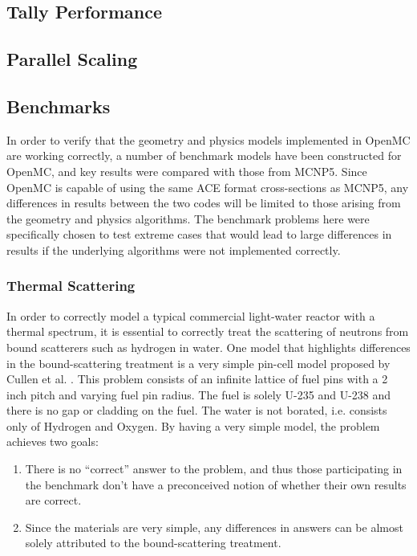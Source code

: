 \documentclass{elsarticle}
\begin{document}
\subsection{Tally Performance}

\subsection{Parallel Scaling}

\subsection{Benchmarks}

In order to verify that the geometry and physics models implemented in OpenMC
are working correctly, a number of benchmark models have been constructed for
OpenMC, and key results were compared with those from MCNP5. Since OpenMC is
capable of using the same ACE format cross-sections as MCNP5, any differences in
results between the two codes will be limited to those arising from the geometry
and physics algorithms. The benchmark problems here were specifically chosen to
test extreme cases that would lead to large differences in results if the
underlying algorithms were not implemented correctly.

\subsubsection{Thermal Scattering}

In order to correctly model a typical commercial light-water reactor with a
thermal spectrum, it is essential to correctly treat the scattering of neutrons
from bound scatterers such as hydrogen in water. One model that highlights
differences in the bound-scattering treatment is a very simple pin-cell model
proposed by Cullen et al. \cite{pincell}. This problem consists of an infinite
lattice of fuel pins with a 2 inch pitch and varying fuel pin radius. The fuel
is solely U-235 and U-238 and there is no gap or cladding on the fuel. The water
is not borated, i.e. consists only of Hydrogen and Oxygen. By having a very
simple model, the problem achieves two goals:
\begin{enumerate}
  \item There is no ``correct'' answer to the problem, and thus those
    participating in the benchmark don't have a preconceived notion of whether
    their own results are correct.
  \item Since the materials are very simple, any differences in answers can be
    almost solely attributed to the bound-scattering treatment.
\end{enumerate}
\end{document}
